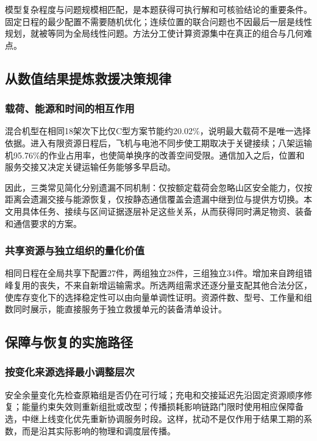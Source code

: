 \documentclass[withoutpreface,colorprint]{format}
\numberwithin{equation}{section}
\numberwithin{figure}{section}
\numberwithin{table}{section}
\begin{document}
模型复杂程度与问题规模相匹配，是本题获得可执行解和可核验结论的重要条件。固定日程的最少配置不需要随机优化；连续位置的联合问题也不因最后一层是线性规划，就被等同为全局线性问题。方法分工使计算资源集中在真正的组合与几何难点。

\subsection{从数值结果提炼救援决策规律}
\subsubsection{载荷、能源和时间的相互作用}
混合机型在相同18架次下比仅C型方案节能约20.02\%，说明最大载荷不是唯一选择依据。进入有限资源日程后，飞机与电池不同步使工期取决于关键接续；八架运输机95.76\%的作业占用率，也使简单换序的改善空间受限。通信加入之后，位置和服务交接又决定关键运输任务能够多早启动。

因此，三类常见简化分别遗漏不同机制：仅按额定载荷会忽略山区安全能力，仅按距离会遗漏交接与能源恢复，仅按静态通信覆盖会遗漏中继到位与提供方切换。本文用具体任务、接续与区间证据逐层补足这些关系，从而获得同时满足物资、装备和通信要求的方案。

\subsubsection{共享资源与独立组织的量化价值}
相同日程在全局共享下配置27件，两组独立28件，三组独立34件。增加来自跨组错峰复用的丧失，不来自新增运输需求。所选两组需求还逐分量支配其他合法分区，使库存变化下的选择稳定性可以由向量单调性证明。资源件数、型号、工作量和组数同时展示，能直接服务于独立救援单元的装备清单设计。

\subsection{保障与恢复的实施路径}
\subsubsection{按变化来源选择最小调整层次}
安全余量变化先检查原箱组是否仍在可行域；充电和交接延迟先沿固定资源顺序修复；能量约束失效则重新组批或改型；传播损耗影响链路门限时使用相应保障备选，中继上线变化优先重新协调服务时段。这样，扰动不是仅作用于结果工期的系数，而是沿其实际影响的物理和调度层传播。
\end{document}
